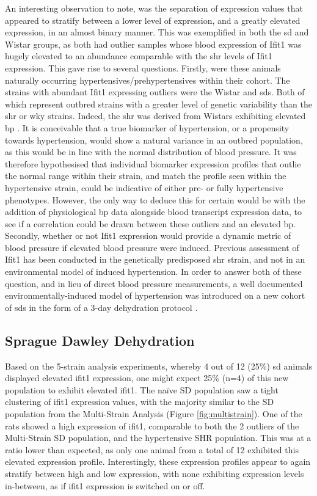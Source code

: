 An interesting observation to note, was the separation of expression values that appeared to stratify between a lower level of expression, and a greatly elevated expression, in an almost binary manner. This was exemplified in both the \acrshort{sd} and Wistar groups, as both had outlier samples whose blood expression of Ifit1 was hugely elevated to an abundance comparable with the \acrshort{shr} levels of Ifit1 expression. This gave rise to several questions. Firstly, were these animals naturally occurring hypertensives/prehypertensives within their cohort. The strains with abundant Ifit1 expressing outliers were the Wistar and \acrshort{sd}s. Both of which represent outbred strains with a greater level of genetic variability than the \acrshort{shr} or \acrshort{wky} strains. Indeed, the \acrshort{shr} was derived from Wistars exhibiting elevated \acrshort{bp} \cite{NAP20031}.  It is conceivable that a true biomarker of hypertension, or a propensity towards hypertension, would show a natural variance in an outbred population, as this would be in line with the normal distribution of blood pressure. It was therefore hypothesised that individual biomarker expression profiles that outlie the normal range within their strain, and match the profile seen within the hypertensive strain, could be indicative of either pre- or fully hypertensive phenotypes. However, the only way to deduce this for certain would be with the addition of physiological \acrshort{bp} data alongside blood transcript expression data, to see if a correlation could be drawn between these outliers and an elevated \acrshort{bp}. Secondly, whether or not Ifit1 expression would provide a dynamic metric of blood pressure if elevated blood pressure were induced. Previous assessment of Ifit1 has been conducted in the genetically predisposed \acrshort{shr} strain, and not in an environmental model of induced hypertension. In order to answer both of these question, and in lieu of direct blood pressure measurements, a well documented environmentally-induced model of hypertension was introduced on a new cohort of \acrshort{sd}s in the form of a 3-day dehydration protocol \cite{Colombari2011,Antunes2006}.

\subsection{Sprague Dawley Dehydration}

Based on the 5-strain analysis experiments, whereby 4 out of 12 (25\%) \acrshort{sd} animals displayed elevated ifit1 expression, one might expect 25\% (n=4) of this new population to exhibit elevated ifit1. The naïve SD population saw a tight clustering of ifit1 expression values, with the majority similar to the SD population from the Multi-Strain Analysis (Figure \ref{fig:multistrain}). One of the rats showed a high expression of ifit1, comparable to both the 2 outliers of the Multi-Strain SD population, and the hypertensive SHR population. This was at a ratio lower than expected, as only one animal from a total of 12 exhibited this elevated expression profile. Interestingly, these expression profiles appear to again stratify between high and low expression, with none exhibiting expression levels in-between, as if ifit1 expression is switched on or off. 

